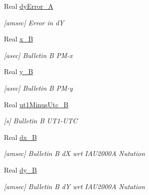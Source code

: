\begin{DoxyCompactItemize}
Real \hyperlink{structlibrary_1_1physics_1_1coord_1_1frame_1_1provider_1_1iers_1_1_finals2000_a_1_1_data_ab0b291e4b6e8c890373c75876eeab417}{dy\+Error\+\_\+A}
\begin{DoxyCompactList}\small\item\em \mbox{[}amsec\mbox{]} Error in dY \end{DoxyCompactList}\item 
Real \hyperlink{structlibrary_1_1physics_1_1coord_1_1frame_1_1provider_1_1iers_1_1_finals2000_a_1_1_data_a5729afe47fa67245be7c1c87b8ee0ab1}{x\+\_\+B}
\begin{DoxyCompactList}\small\item\em \mbox{[}asec\mbox{]} Bulletin B P\+M-\/x \end{DoxyCompactList}\item 
Real \hyperlink{structlibrary_1_1physics_1_1coord_1_1frame_1_1provider_1_1iers_1_1_finals2000_a_1_1_data_a6a94145541224a8b0624286543560bab}{y\+\_\+B}
\begin{DoxyCompactList}\small\item\em \mbox{[}asec\mbox{]} Bulletin B P\+M-\/y \end{DoxyCompactList}\item 
Real \hyperlink{structlibrary_1_1physics_1_1coord_1_1frame_1_1provider_1_1iers_1_1_finals2000_a_1_1_data_acb877d7982f457d1c673ec9d3345ed6d}{ut1\+Minus\+Utc\+\_\+B}
\begin{DoxyCompactList}\small\item\em \mbox{[}s\mbox{]} Bulletin B U\+T1-\/\+U\+TC \end{DoxyCompactList}\item 
Real \hyperlink{structlibrary_1_1physics_1_1coord_1_1frame_1_1provider_1_1iers_1_1_finals2000_a_1_1_data_abbe4de01a55dd732968ae1d5ce29d03f}{dx\+\_\+B}
\begin{DoxyCompactList}\small\item\em \mbox{[}amsec\mbox{]} Bulletin B dX wrt I\+A\+U2000A Nutation \end{DoxyCompactList}\item 
Real \hyperlink{structlibrary_1_1physics_1_1coord_1_1frame_1_1provider_1_1iers_1_1_finals2000_a_1_1_data_a4abde09f9207049900da449411801c53}{dy\+\_\+B}
\begin{DoxyCompactList}\small\item\em \mbox{[}amsec\mbox{]} Bulletin B dY wrt I\+A\+U2000A Nutation \end{DoxyCompactList}\end{DoxyCompactItemize}


